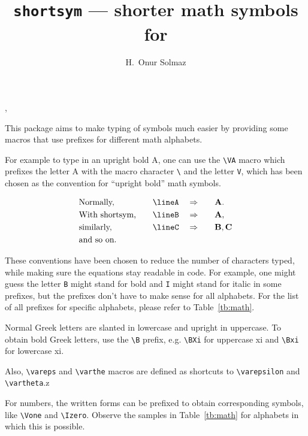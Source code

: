 \documentclass[]{article}
\title{\texttt{shortsym}\textnormal{ --- shorter math symbols for \LaTeXe}}
\author{H.\ Onur Solmaz}
\begin{document}
\maketitle

\begin{myverbbox}{\lineA}
\end{myverbbox}

\begin{myverbbox}{\lineB}
\VA
\end{myverbbox}

\begin{myverbbox}{\lineC}
\VB, \VC
\end{myverbbox}


This package aims to make typing of symbols much easier by providing some macros
that use prefixes for different math alphabets.

For example to type in an
upright bold A, one can use the \verb+\VA+ macro which prefixes the letter A
with the macro character \verb+\+ and the letter \verb+V+, which has been chosen
as the convention for ``upright bold'' math symbols.

\begin{alignat*}{4}
  &\text{Normally,}  & \lineA \quad &\Rightarrow \quad && \VA. \\
  &\text{With shortsym,} \quad  & \lineB \quad &\Rightarrow \quad && \VA, \\
  &\text{similarly,}  & \lineC \quad &\Rightarrow \quad && \VB, \VC \\
  &\text{and so on.}  &  & &&  \\
\end{alignat*}

These conventions have been chosen to reduce the number of characters typed,
while making sure the equations stay readable in code. For example, one might guess
the letter \texttt{B} might stand for bold and \texttt{I} might stand for italic in some prefixes,
but the prefixes don't have to make sense for all alphabets.
For the list of all prefixes for
specific alphabets, please refer to Table~\ref{tb:math}.

Normal Greek letters are slanted in lowercase and upright in uppercase. To
obtain bold Greek letters, use the \verb+\B+ prefix, e.g. \verb+\BXi+ for
uppercase xi and \verb+\Bxi+ for lowercase xi.

Also, \verb+\vareps+ and \verb+\varthe+ macros are defined as shortcuts to
\verb+\varepsilon+ and \verb+\vartheta+.z

For numbers, the written forms can be prefixed to obtain corresponding symbols,
like \verb+\Vone+ and \verb+\Izero+. Observe the samples in Table~\ref{tb:math}
for alphabets in which this is possible.
\end{document}
